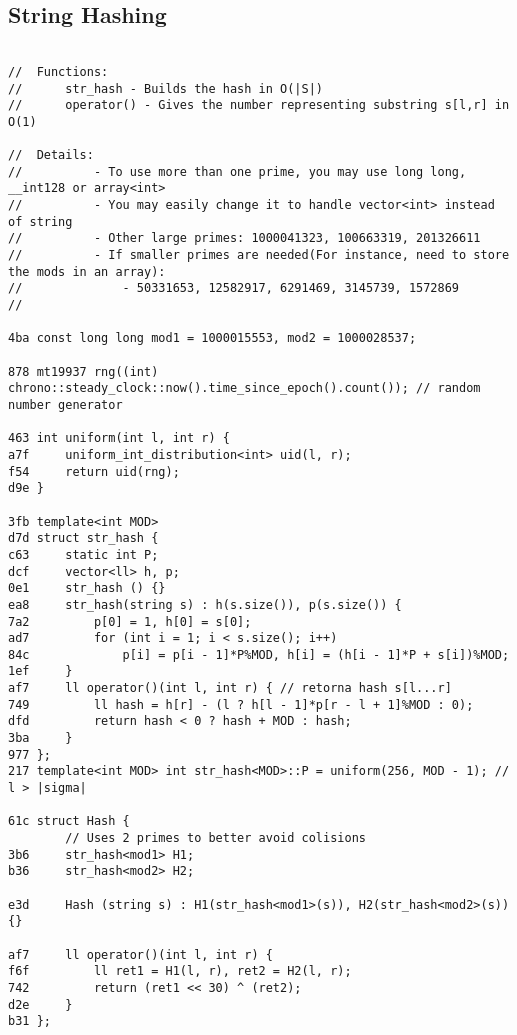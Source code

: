 \documentclass[11pt, a4paper, twoside]{article}
\begin{document}
\subsection{ String Hashing}
\begin{lstlisting}

//  Functions:
//      str_hash - Builds the hash in O(|S|)
//      operator() - Gives the number representing substring s[l,r] in O(1)

//  Details:
//          - To use more than one prime, you may use long long, __int128 or array<int>
//          - You may easily change it to handle vector<int> instead of string
//          - Other large primes: 1000041323, 100663319, 201326611
//          - If smaller primes are needed(For instance, need to store the mods in an array):
//              - 50331653, 12582917, 6291469, 3145739, 1572869
//

4ba const long long mod1 = 1000015553, mod2 = 1000028537;

878 mt19937 rng((int) chrono::steady_clock::now().time_since_epoch().count()); // random number generator

463 int uniform(int l, int r) {
a7f     uniform_int_distribution<int> uid(l, r);
f54     return uid(rng);
d9e }

3fb template<int MOD> 
d7d struct str_hash {
c63     static int P;
dcf     vector<ll> h, p;
0e1     str_hash () {}
ea8     str_hash(string s) : h(s.size()), p(s.size()) {
7a2         p[0] = 1, h[0] = s[0];
ad7         for (int i = 1; i < s.size(); i++)
84c             p[i] = p[i - 1]*P%MOD, h[i] = (h[i - 1]*P + s[i])%MOD;
1ef     }
af7     ll operator()(int l, int r) { // retorna hash s[l...r]
749         ll hash = h[r] - (l ? h[l - 1]*p[r - l + 1]%MOD : 0);
dfd         return hash < 0 ? hash + MOD : hash;
3ba     }
977 };
217 template<int MOD> int str_hash<MOD>::P = uniform(256, MOD - 1); // l > |sigma|

61c struct Hash {
        // Uses 2 primes to better avoid colisions
3b6     str_hash<mod1> H1;
b36     str_hash<mod2> H2;
     
e3d     Hash (string s) : H1(str_hash<mod1>(s)), H2(str_hash<mod2>(s)) {}
     
af7     ll operator()(int l, int r) {
f6f         ll ret1 = H1(l, r), ret2 = H2(l, r);
742         return (ret1 << 30) ^ (ret2);
d2e     }
b31 };
\end{lstlisting}
\end{document}

